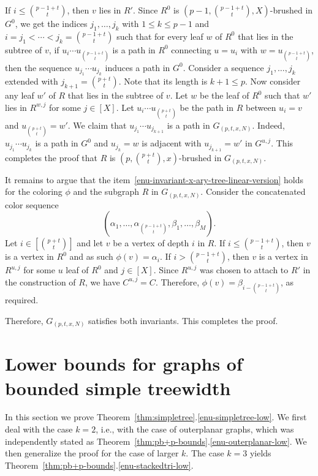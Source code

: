 If $i\leq \binom{p-1+t}{t}$, then $v$ lies in $R'$.
Since $R^0$ is $(p-1,\binom{p-1+t}{t},X)$-brushed in $G^0$, we get the indices $j_1,\ldots,j_k$ with 
$1\leq k\leq p-1$ and $i=j_1 < \cdots < j_k = \binom{p-1+t}{t}$ such that for every leaf $w$ of $R^{0}$ that lies in the subtree of $v$, if $u_{i}\cdots u_{\binom{p-1+t}{t}}$ is a path in $R^0$ connecting $u=u_{i}$ with $w=u_{\binom{p-1+t}{t}}$, then the sequence $u_{j_1}\cdots u_{j_k}$ induces a path in $G^0$.
Consider a sequence $j_1,\ldots,j_k$ extended with $j_{k+1} = \binom{p+t}{t}$. 
Note that its length is $k+1 \leq p$.
Now consider any leaf $w'$ of $R$ that lies in the subtree of $v$. 
Let $w$ be the leaf of $R^0$ such that $w'$ lies in $R^{w,j}$ for some $j\in[X]$. 
Let $u_i\cdots u_{\binom{p+t}{t}}$ be the path in $R$ between $u_i=v$ and $u_{\binom{p+t}{t}}=w'$.
We claim that $u_{j_1}\cdots u_{j_{k+1}}$ is a path in $G_{(p,t,x,N)}$.
Indeed, $u_{j_1}\cdots u_{j_{k}}$ is a path in $G^0$ and $u_{j_k}=w$ is adjacent with $u_{j_{k+1}}=w'$ in $G^{u,j}$.
This completes the proof that $R$ is $\left(p,\binom{p+t}{t},x\right)$-brushed in $G_{(p,t,x,N)}$.

It remains to argue that the item~\eqref{enu-invariant-x-ary-tree-linear-version} holds for the coloring $\phi$ and the subgraph $R$ in $G_{(p,t,x,N)}$.
Consider the concatenated color sequence
\[
\left(\alpha_1,\ldots,\alpha_{\binom{p-1+t}{t}},\beta_1,\ldots,\beta_M\right).
\]
Let $i\in\left[\binom{p+t}{t}\right]$ and let $v$ be a vertex of depth $i$ in $R$.
If $i \leq \binom{p-1+t}{t}$, then $v$ is a vertex in $R^0$ and as such $\phi(v)=\alpha_i$. 
If $i > \binom{p-1+t}{t}$, then $v$ is a vertex in $R^{u,j}$ for some $u$ leaf of $R^0$ and $j\in[X]$. 
Since $R^{u,j}$ was chosen to attach to $R'$ in the construction of $R$, we have $C^{u,j}=C$.
Therefore, $\phi(v) = \beta_{i - \binom{p-1+t}{t}}$, as required.

Therefore, $G_{(p,t,x,N)}$ satisfies both invariants.
This completes the proof.

\section{Lower bounds for graphs of bounded simple treewidth}
\label{sec-lower-bounds-subplanars}

In this section we prove Theorem~\ref{thm:simpletree}.\ref{enu-simpletree-low}.
We first deal with the case $k=2$, i.e., with the case of outerplanar graphs,
which was independently stated as Theorem~\ref{thm:pb+p-bounds}.\ref{enu-outerplanar-low}. 
We then generalize the proof for the case of larger $k$. The case $k=3$
yields Theorem~\ref{thm:pb+p-bounds}.\ref{enu-stackedtri-low}.

